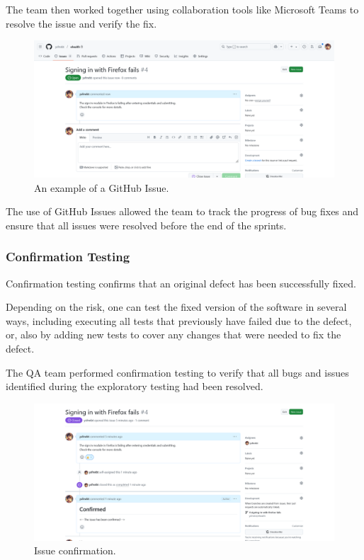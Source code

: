 The team then worked together using collaboration tools like Microsoft Teams to resolve the issue and verify the fix.

\begin{figure}[H]
    \centering
    \includegraphics[width=\textwidth]{project/images/github-issue.png}
    \caption{An example of a GitHub Issue.}
    \label{fig:github-issue}
\end{figure}

The use of GitHub Issues allowed the team to track the progress of bug fixes and ensure that all issues were resolved before the end of the sprints.

\subsubsection{Confirmation Testing}

Confirmation testing confirms that an original defect has been successfully fixed. \cite{istqbctfl4.0.1}

Depending on the risk, one can test the fixed version of the software in several ways, including executing all tests that previously have failed due to the defect, or, also by adding new tests to cover any changes that were needed to fix the defect.  \cite{istqbctfl4.0.1}

The QA team performed confirmation testing to verify that all bugs and issues identified during the exploratory testing had been resolved.

\begin{figure}[H]
    \centering
    \includegraphics[width=\textwidth]{project/images/issue-confirmed.png}
    \caption{Issue confirmation.}
    \label{fig:issue-confirmed}
\end{figure}

